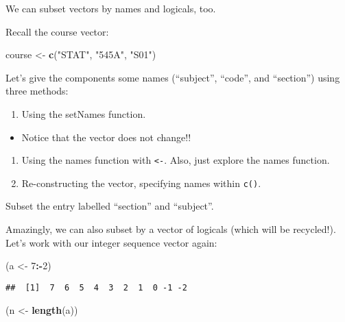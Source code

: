 \documentclass[]{article}
\newenvironment{Shaded}{\begin{snugshade}}{\end{snugshade}}
\newcommand{\KeywordTok}[1]{\textcolor[rgb]{0.13,0.29,0.53}{\textbf{#1}}}
\newcommand{\DecValTok}[1]{\textcolor[rgb]{0.00,0.00,0.81}{#1}}
\newcommand{\StringTok}[1]{\textcolor[rgb]{0.31,0.60,0.02}{#1}}
\newcommand{\OperatorTok}[1]{\textcolor[rgb]{0.81,0.36,0.00}{\textbf{#1}}}
\newcommand{\NormalTok}[1]{#1}
\providecommand{\tightlist}{%
  \setlength{\itemsep}{0pt}\setlength{\parskip}{0pt}}
\begin{document}
We can subset vectors by names and logicals, too.

Recall the course vector:

\begin{Shaded}
\begin{Highlighting}[]
\NormalTok{course <-}\StringTok{ }\KeywordTok{c}\NormalTok{(}\StringTok{"STAT"}\NormalTok{, }\StringTok{"545A"}\NormalTok{, }\StringTok{"S01"}\NormalTok{)}
\end{Highlighting}
\end{Shaded}

Let's give the components some names (``subject'', ``code'', and
``section'') using three methods:

\begin{enumerate}
\def\labelenumi{\arabic{enumi}.}
\tightlist
\item
  Using the setNames function.
\end{enumerate}

\begin{itemize}
\tightlist
\item
  Notice that the vector does not change!!
\end{itemize}

\begin{enumerate}
\def\labelenumi{\arabic{enumi}.}
\setcounter{enumi}{1}
\item
  Using the names function with \texttt{\textless{}-}. Also, just
  explore the names function.
\item
  Re-constructing the vector, specifying names within \texttt{c()}.
\end{enumerate}

Subset the entry labelled ``section'' and ``subject''.

Amazingly, we can also subset by a vector of logicals (which will be
recycled!). Let's work with our integer sequence vector again:

\begin{Shaded}
\begin{Highlighting}[]
\NormalTok{(a <-}\StringTok{ }\DecValTok{7}\OperatorTok{:-}\DecValTok{2}\NormalTok{)}
\end{Highlighting}
\end{Shaded}

\begin{verbatim}
##  [1]  7  6  5  4  3  2  1  0 -1 -2
\end{verbatim}

\begin{Shaded}
\begin{Highlighting}[]
\NormalTok{(n <-}\StringTok{ }\KeywordTok{length}\NormalTok{(a))}
\end{Highlighting}
\end{Shaded}
\end{document}
